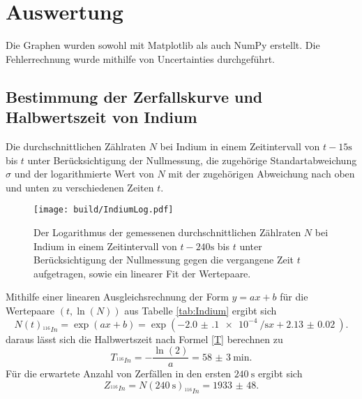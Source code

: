 \section{Auswertung}
\label{sec:Auswertung}


Die Graphen wurden sowohl mit Matplotlib \cite{matplotlib} als auch NumPy \cite{numpy} erstellt. Die
Fehlerrechnung wurde mithilfe von Uncertainties \cite{uncertainties} durchgeführt.


\subsection{Bestimmung der Zerfallskurve und Halbwertszeit von Indium}
 \begin{table}
  \centering
  \caption{Die durchschnittlichen Zählraten $N$ bei Indium in einem Zeitintervall von $t-15\si{\second}$ bis $t$ unter Berücksichtigung der Nullmessung, die zugehörige Standartabweichung $\sigma$ und der logarithmierte Wert von $N$ mit der zugehörigen Abweichung nach oben und unten zu verschiedenen Zeiten $t$.}
  
 \end{table}
\begin{figure}
	\centering
	\caption{Der Logarithmus der gemessenen durchschnittlichen Zählraten $N$ bei Indium in einem Zeitintervall von $t-240\si{\second}$ bis $t$ unter Berücksichtigung der Nullmessung gegen die vergangene Zeit $t$ aufgetragen, sowie ein linearer Fit der Wertepaare.}
	\texttt{[image: build/IndiumLog.pdf]}
	\label{fig:Indium}
\end{figure}
Mithilfe einer linearen Ausgleichsrechnung der Form $y=a x + b$ für die Wertepaare $(t, \ln(N))$ aus Tabelle \ref{tab:Indium} ergibt sich
\begin{equation}
	N(t)_{^{116}In}=\exp\left(a x + b\right)=\exp\left(\SI{-2.0(1)e-4}{\per\second} x + \SI{2.13(2)}{}\right)\text{.}
\end{equation}
daraus lässt sich die Halbwertszeit nach Formel \eqref{T} berechnen zu
\begin{equation}
	T_{^{116}In}=-\frac{\ln(2)}{a}=\SI{58(3)}{\minute}\text{.}
\end{equation}
Für die erwartete Anzahl von Zerfällen in den ersten $\SI{240}{\second}$ ergibt sich
\begin{equation}
	Z_{^{116}In} = N(\SI{240}{\second})_{^{116}In}=\num{1933(48)}\text{.}
\end{equation}

